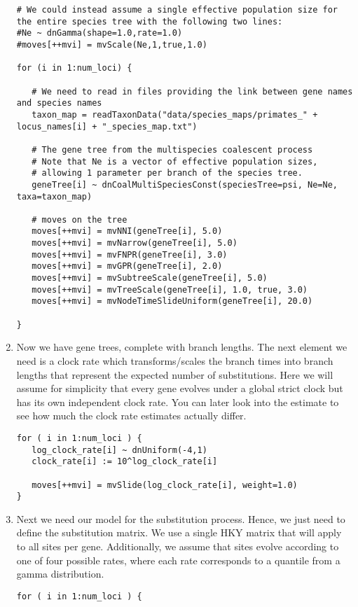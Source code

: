 \begin{enumerate}
{\begin{snugshade*}
\begin{lstlisting}
# We could instead assume a single effective population size for the entire species tree with the following two lines:
#Ne ~ dnGamma(shape=1.0,rate=1.0)
#moves[++mvi] = mvScale(Ne,1,true,1.0)

for (i in 1:num_loci) {

   # We need to read in files providing the link between gene names and species names
   taxon_map = readTaxonData("data/species_maps/primates_" + locus_names[i] + "_species_map.txt")

   # The gene tree from the multispecies coalescent process
   # Note that Ne is a vector of effective population sizes, 
   # allowing 1 parameter per branch of the species tree.
   geneTree[i] ~ dnCoalMultiSpeciesConst(speciesTree=psi, Ne=Ne, taxa=taxon_map)

   # moves on the tree
   moves[++mvi] = mvNNI(geneTree[i], 5.0)
   moves[++mvi] = mvNarrow(geneTree[i], 5.0)
   moves[++mvi] = mvFNPR(geneTree[i], 3.0)
   moves[++mvi] = mvGPR(geneTree[i], 2.0)
   moves[++mvi] = mvSubtreeScale(geneTree[i], 5.0)
   moves[++mvi] = mvTreeScale(geneTree[i], 1.0, true, 3.0)
   moves[++mvi] = mvNodeTimeSlideUniform(geneTree[i], 20.0)

}

\end{lstlisting}
\end{snugshade*}}

\item Now we have gene trees, complete with branch lengths. 
The next element we need is a clock rate which transforms/scales the branch times into branch lengths that represent the expected number of substitutions.
Here we will assume for simplicity that every gene evolves under a global strict clock but has its own independent clock rate.
You can later look into the estimate to see how much the clock rate estimates actually differ.
{\tt \begin{snugshade*}
\begin{lstlisting}
for ( i in 1:num_loci ) { 
   log_clock_rate[i] ~ dnUniform(-4,1)
   clock_rate[i] := 10^log_clock_rate[i]
   
   moves[++mvi] = mvSlide(log_clock_rate[i], weight=1.0)
}
\end{lstlisting}
\end{snugshade*}}

\item Next we need our model for the substitution process. 
Hence, we just need to define the substitution matrix. 
We use a single HKY matrix that will apply to all sites per gene.
Additionally, we assume that sites evolve according to one of four possible rates, where each rate corresponds to a quantile from a gamma distribution.
{\tt \begin{snugshade*}
\begin{lstlisting}
for ( i in 1:num_loci ) {


\end{lstlisting}
\end{snugshade*}}
\end{enumerate}
